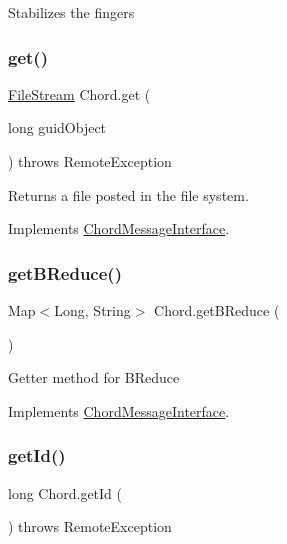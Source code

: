 Stabilizes the fingers \mbox{\label{class_chord_af273d965e3657c05bd7edcc9f956da23}} 
\subsubsection{\texorpdfstring{get()}{get()}}
{\footnotesize\ttfamily \mbox{\hyperlink{class_file_stream}{File\+Stream}} Chord.\+get (\begin{DoxyParamCaption}\item[{long}]{guid\+Object }\end{DoxyParamCaption}) throws Remote\+Exception\hspace{0.3cm}{\ttfamily [inline]}}

Returns a file posted in the file system. 

Implements \mbox{\hyperlink{interface_chord_message_interface}{Chord\+Message\+Interface}}.

\mbox{\label{class_chord_a2439783b411fe026b15a78ba6aeeb95f}} 
\subsubsection{\texorpdfstring{get\+B\+Reduce()}{getBReduce()}}
{\footnotesize\ttfamily Map$<$Long, String$>$ Chord.\+get\+B\+Reduce (\begin{DoxyParamCaption}{ }\end{DoxyParamCaption})\hspace{0.3cm}{\ttfamily [inline]}}

Getter method for B\+Reduce 

Implements \mbox{\hyperlink{interface_chord_message_interface}{Chord\+Message\+Interface}}.

\mbox{\label{class_chord_a3dfb600d109b7d23459a3353af0274a9}} 
\subsubsection{\texorpdfstring{get\+Id()}{getId()}}
{\footnotesize\ttfamily long Chord.\+get\+Id (\begin{DoxyParamCaption}{ }\end{DoxyParamCaption}) throws Remote\+Exception\hspace{0.3cm}{\ttfamily [inline]}}

